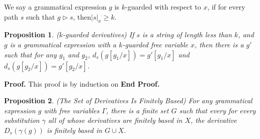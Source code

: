 \documentclass{article}
\newcommand{\deriv}[2]{d_{#1}({#2})}
\newcommand{\path}[2]{{#1}\rhd{#2}}
\newcommand{\guard}[2]{|{#1}|_{#2}}
\newtheorem{prop}{Proposition}
\newenvironment{proof}{\noindent\textbf{Proof.}}
{\noindent\textbf{End Proof.}}
\begin{document}
We say a grammatical expression $g$ is $k$-guarded with respect to
$x$, if for every path $s$ such that $\path{g}{s}$, then$\guard{s}{x} \geq k$. 



\begin{prop}{($k$-guarded derivatives)}
  If $s$ is a string of length less than $k$, and $g$ is a grammatical expression with a 
  $k$-guarded free variable $x$, then there is a $g'$ such that for any $g_1$ and $g_2$, 
  $\deriv{s}{g[g_1/x]} = g'[g_1/x]$ and $\deriv{s}{g[g_2/x]} = g'[g_2/x]$. 
\end{prop}

\begin{proof}
  This proof is by induction on 
\end{proof}


\begin{prop}{(The Set of Derivatives Is Finitely Based)}
For any grammatical expression $g$ with free variables $\Gamma$, there
is a finite set $G$ such that every for every substitution $\gamma$ all of 
whose derivatives are finitely based in $X$, the derivative $D_s(\gamma(g))$ 
is finitely based in $G \cup X$.  
\end{prop}
\end{document}
